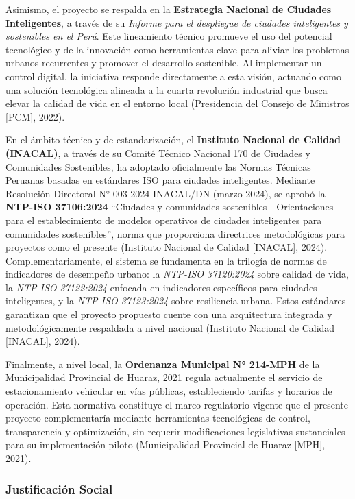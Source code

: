 \documentclass[12pt,a4paper]{article}
\begin{document}
Asimismo, el proyecto se respalda en la \textbf{Estrategia Nacional de Ciudades Inteligentes}, a través de su \textit{Informe para el despliegue de ciudades inteligentes y sostenibles en el Perú}. Este lineamiento técnico promueve el uso del potencial tecnológico y de la innovación como herramientas clave para aliviar los problemas urbanos recurrentes y promover el desarrollo sostenible. Al implementar un control digital, la iniciativa responde directamente a esta visión, actuando como una solución tecnológica alineada a la cuarta revolución industrial que busca elevar la calidad de vida en el entorno local (Presidencia del Consejo de Ministros [PCM], 2022).

En el ámbito técnico y de estandarización, el \textbf{Instituto Nacional de Calidad (INACAL)}, a través de su Comité Técnico Nacional 170 de Ciudades y Comunidades Sostenibles, ha adoptado oficialmente las Normas Técnicas Peruanas basadas en estándares ISO para ciudades inteligentes. Mediante Resolución Directoral N° 003-2024-INACAL/DN (marzo 2024), se aprobó la \textbf{NTP-ISO 37106:2024} ``Ciudades y comunidades sostenibles - Orientaciones para el establecimiento de modelos operativos de ciudades inteligentes para comunidades sostenibles'', norma que proporciona directrices metodológicas para proyectos como el presente (Instituto Nacional de Calidad [INACAL], 2024). Complementariamente, el sistema se fundamenta en la trilogía de normas de indicadores de desempeño urbano: la \textit{NTP-ISO 37120:2024} sobre calidad de vida, la \textit{NTP-ISO 37122:2024} enfocada en indicadores específicos para ciudades inteligentes, y la \textit{NTP-ISO 37123:2024} sobre resiliencia urbana. Estos estándares garantizan que el proyecto propuesto cuente con una arquitectura integrada y metodológicamente respaldada a nivel nacional (Instituto Nacional de Calidad [INACAL], 2024).

Finalmente, a nivel local, la \textbf{Ordenanza Municipal N° 214-MPH} de la Municipalidad Provincial de Huaraz, 2021 regula actualmente el servicio de estacionamiento vehicular en vías públicas, estableciendo tarifas y horarios de operación. Esta normativa constituye el marco regulatorio vigente que el presente proyecto complementaría mediante herramientas tecnológicas de control, transparencia y optimización, sin requerir modificaciones legislativas sustanciales para su implementación piloto (Municipalidad Provincial de Huaraz [MPH], 2021).

\subsubsection{Justificación Social}
\end{document}

